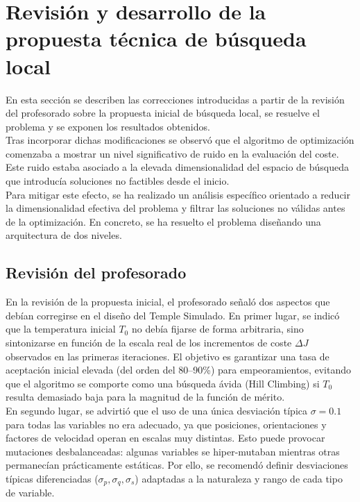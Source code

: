 \newpage
{}
\section*{Revisión y desarrollo de la propuesta técnica de búsqueda local}
En esta sección se describen las correcciones introducidas a partir de la revisión del profesorado
sobre la propuesta inicial de búsqueda local, se resuelve el problema y se exponen los resultados obtenidos.\\

Tras incorporar dichas modificaciones se observó que
el algoritmo de optimización comenzaba a mostrar un nivel significativo de ruido en la evaluación del coste.
Este ruido estaba asociado a la elevada dimensionalidad del espacio de búsqueda que introducía
soluciones no factibles desde el inicio. \\

Para mitigar este efecto, se ha realizado un análisis específico orientado a reducir la dimensionalidad 
efectiva del problema y filtrar las soluciones no válidas antes de la optimización. En concreto, se 
ha resuelto el problema diseñando una arquitectura de dos niveles.

\subsection*{Revisión del profesorado}
En la revisión de la propuesta inicial, el profesorado señaló dos aspectos
que debían corregirse en el diseño del Temple Simulado. En primer lugar, se indicó
que la temperatura inicial \(T_0\) no debía fijarse de forma arbitraria, sino
sintonizarse en función de la escala real de los incrementos de coste
\(\Delta J\) observados en las primeras iteraciones. El objetivo es garantizar
una tasa de aceptación inicial elevada (del orden del 80--90\%) para
empeoramientos, evitando que el algoritmo se comporte como una búsqueda ávida
(Hill Climbing) si \(T_0\) resulta demasiado baja para la magnitud de la función
de mérito. \\

En segundo lugar, se advirtió que el uso de una única desviación típica
\(\sigma = 0.1\) para todas las variables no era adecuado, ya que posiciones,
orientaciones y factores de velocidad operan en escalas muy distintas. Esto puede
provocar mutaciones desbalanceadas: algunas variables se hiper-mutaban mientras
otras permanecían prácticamente estáticas. Por ello, se recomendó definir
desviaciones típicas diferenciadas (\(\sigma_p, \sigma_q, \sigma_s\)) adaptadas
a la naturaleza y rango de cada tipo de variable. \\

